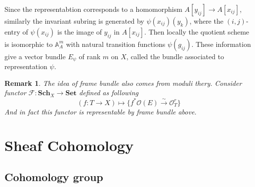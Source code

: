\documentclass{ctexart}
\newtheorem{remark}{Remark}[section]
\newcommand{\sets}{\mathbf{Set}}
\newcommand{\scheme}{\mathbf{Sch}}
\begin{document}
Since the representabtion corresponds to a homomorphism $A[y_{ij}] \rightarrow A[x_{ij}]$,
similarly the invariant subring is generated by $\psi(x_{ij})(y_{k})$,
where the $(i, j)$-entry of $\psi(x_{ij})$ is the image of $y_{ij}$ in $A[x_{ij}]$.
Then locally the quotient scheme is isomorphic to $\mathbb{A}_{A}^{m}$ with natural transition functions $\psi(g_{ij})$.
These information give a vector bundle $E_{\psi}$ of rank $m$ on $X$, called the bundle associated to representation $\psi$.
\begin{remark}
    The idea of frame bundle also comes from moduli thery.
    Consider functor $\mathcal{F}: \scheme_{X} \rightarrow \sets$ defined as following
    \begin{equation}
        (f: T \rightarrow X) \longmapsto \{f^{\ast}\mathcal{O}(E) \overset{\sim}{\rightarrow} \mathcal{O}_{T}^{r}\}
    \end{equation}
    And in fact this functor is representable by frame bundle above.
\end{remark}

\section{Sheaf Cohomology}
\label{section:Sheaf_Cohomology}

\subsection{Cohomology group}
\label{subsection:Sheaf_Cohomology_Cohomology_group}
\end{document}
